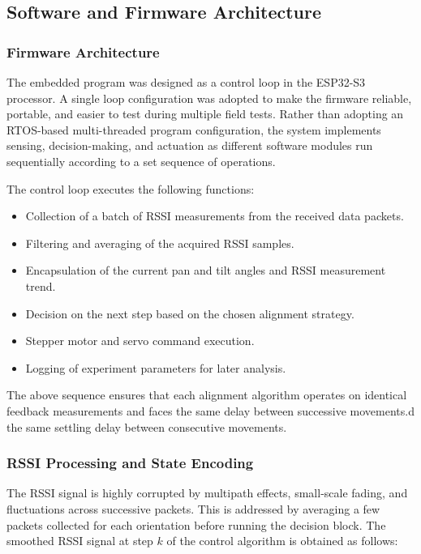 \subsection{Software and Firmware Architecture}

\subsubsection{Firmware Architecture}

The embedded program was designed as a control loop in the ESP32-S3 processor. A single
loop configuration was adopted to make the firmware reliable, portable, and easier to test
during multiple field tests. Rather than adopting an RTOS-based multi-threaded program
configuration, the system implements sensing, decision-making, and actuation as different
software modules run sequentially according to a set sequence of operations.

The control loop executes the following functions:
\begin{itemize}
\item Collection of a batch of RSSI measurements from the received data packets.
\item Filtering and averaging of the acquired RSSI samples.
\item Encapsulation of the current pan and tilt angles and RSSI measurement trend.
\item Decision on the next step based on the chosen alignment strategy.
\item Stepper motor and servo command execution.
\item Logging of experiment parameters for later analysis.
\end{itemize}

The above sequence ensures that each alignment algorithm operates on identical feedback
measurements and faces the same delay between successive movements.d the same settling delay between consecutive movements.


\subsubsection{RSSI Processing and State Encoding}

The RSSI signal is highly corrupted by multipath effects, small-scale fading, and
fluctuations across successive packets. This is addressed by averaging a few packets
collected for each orientation before running the decision block. The smoothed RSSI
signal at step $k$ of the control algorithm is obtained as follows:

